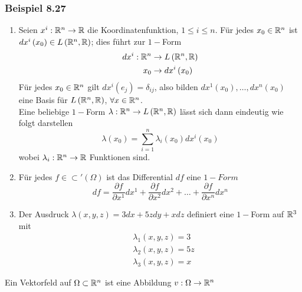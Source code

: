 \subsubsection*{Beispiel 8.27}
\begin{enumerate}
\item Seien $x^i:\mathbb{R}^n\to\mathbb{R}$ die Koordinatenfunktion, $1\leq i\leq n$. Für jedes $x_0\in\mathbb{R}^n$ ist $dx^i\left(x_0\right)\in L\left( \mathbb{R}^n,\mathbb{R}\right)$; dies führt zur $1-$Form
\begin{align*}
dx^i:\mathbb{R}^n&\to L\left( \mathbb{R}^n,\mathbb{R}\right)\\
x_0 &\to dx^i\left( x_0\right)
\end{align*}
Für jedes $x_0\in\mathbb{R}^n$ gilt $dx^i\left(e_j\right)=\delta_{ij}$, also bilden $dx^1\left( x_0\right),\dots,dx^n\left( x_0\right)$ eine Basis für $L\left(\mathbb{R}^n,\mathbb{R}\right)$, $\forall x\in\mathbb{R}^n$.\\

Eine beliebige $1-$Form $\lambda :\mathbb{R}^n\to L\left(\mathbb{R}^n,\mathbb{R}\right)$ lässt sich dann eindeutig wie folgt darstellen \[\lambda \left( {{x_0}} \right) = \sum\limits_{i = 1}^n {{\lambda _i}\left( {{x_0}} \right)d{x^i}\left( {{x_0}} \right)} \] wobei $\lambda_i:\mathbb{R}^n\to\mathbb{R}$ Funktionen sind.
\item Für jedes $f\in\subset'\left(\Omega\right)$ ist das Differential $df$ eine $1-Form$ \[df = \frac{{\partial f}}{{\partial {x^1}}}d{x^1} + \frac{{\partial f}}{{\partial {x^2}}}d{x^2} +  \ldots  + \frac{{\partial f}}{{\partial {x^n}}}d{x^n}\]
\item Der Ausdruck $\lambda\left(x,y,z\right)=3dx+5zdy+xdz$ definiert eine $1-$Form auf $\mathbb{R}^3$ mit
\begin{align*}
& \lambda_1\left(x,y,z\right)=3\\
& \lambda_2\left(x,y,z\right)=5z\\
& \lambda_3\left(x,y,z\right)=x
\end{align*}
\end{enumerate}
\begin{definition}{8.28}
Ein Vektorfeld auf $\Omega\subset\mathbb{R}^n$ ist eine Abbildung $v:\Omega\to\mathbb{R}^n$
\end{definition}

